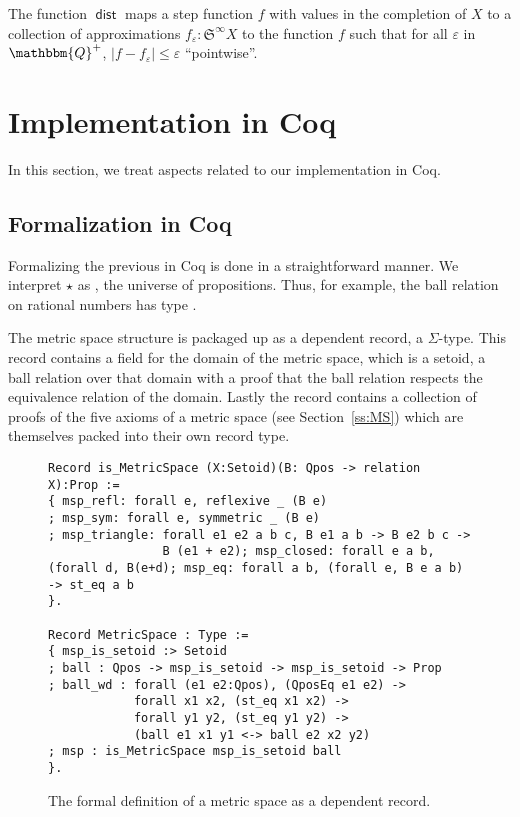 \documentclass{elsarticle}
\newcommand{\op}[1]{#1}
\newcommand{\tmop}[1]{\ensuremath{\operatorname{#1}}}
\newcommand{\tmtexttt}[1]{{\ttfamily{#1}}}
\newcommand{\upl}{+}
\newcommand{\Prop}{\ensuremath{\op{\star}}}
\newcommand{\SF}{\ensuremath{\mathfrak{S}}}
\begin{document}
The function $\tmop{\mathsf{dist}}$ maps a step function $f$ with values in
the completion of $X$ to a collection of approximations $f_{\varepsilon} :
\SF^{\infty} X$ to the function $f$ such that for all $\varepsilon$ in
$\mathbbm{Q}^{\upl}$, $|f - f_{\varepsilon} | \leq \varepsilon$ ``pointwise''.

\section{Implementation in Coq}

In this section, we treat aspects related to our implementation in Coq.

\subsection{Formalization in Coq}\label{ss:FIC}Formalizing the previous in Coq
is done in a straightforward manner. We interpret {\Prop} as
\tmtexttt{Prop}, the universe of propositions. Thus, for example, the ball
relation on rational numbers has type \tmtexttt{Qball : Qpos -> Q -> Q ->
Prop}.

The metric space structure is packaged up as a dependent record, a
$\Sigma$-type. This record contains a field for the domain of the metric
space, which is a setoid, a ball relation over that domain with a proof that
the ball relation respects the equivalence relation of the domain. Lastly the
record contains a collection of proofs of the five axioms of a metric space
(see Section~\ref{ss:MS}) which are themselves packed into their own record
type.

\begin{figure}
\begin{verbatim}
Record is_MetricSpace (X:Setoid)(B: Qpos -> relation X):Prop :=
{ msp_refl: forall e, reflexive _ (B e)
; msp_sym: forall e, symmetric _ (B e)
; msp_triangle: forall e1 e2 a b c, B e1 a b -> B e2 b c ->
                B (e1 + e2); msp_closed: forall e a b,(forall d, B(e+d); msp_eq: forall a b, (forall e, B e a b) -> st_eq a b
}.

Record MetricSpace : Type :=
{ msp_is_setoid :> Setoid
; ball : Qpos -> msp_is_setoid -> msp_is_setoid -> Prop
; ball_wd : forall (e1 e2:Qpos), (QposEq e1 e2) ->
            forall x1 x2, (st_eq x1 x2) ->
            forall y1 y2, (st_eq y1 y2) ->
            (ball e1 x1 y1 <-> ball e2 x2 y2)
; msp : is_MetricSpace msp_is_setoid ball
}.
\end{verbatim}
\caption{The formal definition of a metric space as a dependent record.}
\end{figure}
\end{document}
